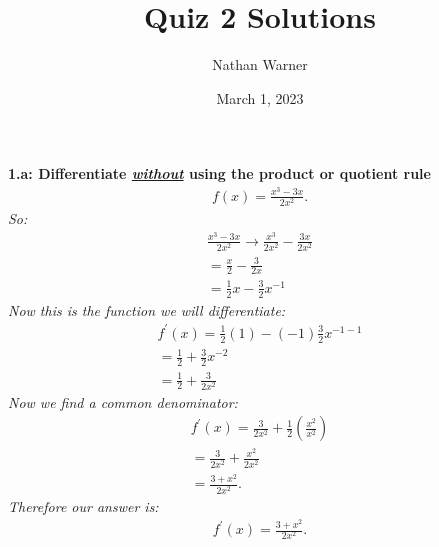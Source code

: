 \documentclass{report}
\title{\Huge{Quiz 2 Solutions}}
\author{\huge{Nathan Warner}}
\date{\huge{March 1, 2023}}
\begin{document}
    \maketitle
    \noindent
    \begin{mdframed}
        \textbf{1.a: Differentiate \textbf{\textit{\underline{without}}} using the product or quotient rule}
        \begin{align*}
            f(x) = \frac{x^{3}-3x}{2x^{2}}
        .\end{align*}
    \bigbreak \noindent 
    \bigbreak \noindent
    \textit{So:}
    \begin{align*}
        \frac{x^{3}- 3x}{2x^{2}} \longrightarrow \frac{x^{3}}{2x^{2}} - \frac{3x}{2x^{2}} \\
        = \frac{x}{2} - \frac{3}{2x} \\ 
        = \frac{1}{2}x - \frac{3}{2}x^{-1}
    \end{align*}
    \bigbreak \noindent
    \textit{Now this is the function we will differentiate:}
    \begin{align*}
        f^{\prime}(x) = \frac{1}{2}(1) - (-1)\frac{3}{2}x^{-1-1}  \\
        = \frac{1}{2} + \frac{3}{2}x^{-2} \\
        = \frac{1}{2}+\frac{3}{2x^{2}}
    \end{align*}
    \textit{Now we find a common denominator:} 
    \begin{align*}
        f^{\prime}(x) = \frac{3}{2x^{2}} + \frac{1}{2}(\frac{x^{2}}{x^{2}}) \\
        =\frac{3}{2x^{2}} + \frac{x^{2}}{2x^{2}} \\
        = \frac{3+x^{2}}{2x^{2}}
    .\end{align*}
    \bigbreak \noindent 
    \textit{Therefore our answer is:}
    \begin{align*}
        f^{\prime}(x) = \frac{3+x^{2}}{2x^{2}}
    .\end{align*}
    \end{mdframed}
\end{document}
